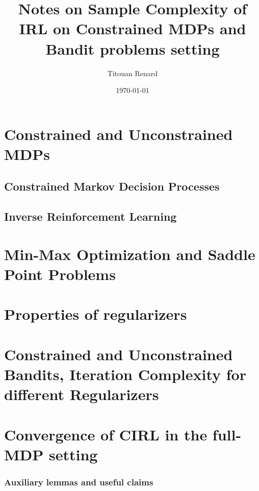 \documentclass[11pt]{article}
\title{Notes on Sample Complexity of IRL on Constrained MDPs and Bandit problems setting}
\date{\today}
\author{Titouan Renard}
\begin{document}
\maketitle	

\tableofcontents

\section{Constrained and Unconstrained MDPs}


\newpage
\subsection{Constrained Markov Decision Processes} \label{sec:cmdps}


\newpage
\subsection{Inverse Reinforcement Learning} \label{sec:irl}


\newpage
\section{Min-Max Optimization and Saddle Point Problems}


\section{Properties of regularizers}


\newpage
\section{Constrained and Unconstrained Bandits, Iteration Complexity for different Regularizers}



% 


\newpage
\section{Convergence of CIRL in the full-MDP setting}

\newpage
\subsubsection{Auxiliary lemmas and useful claims}




\newpage
\printbibliography
\end{document}
